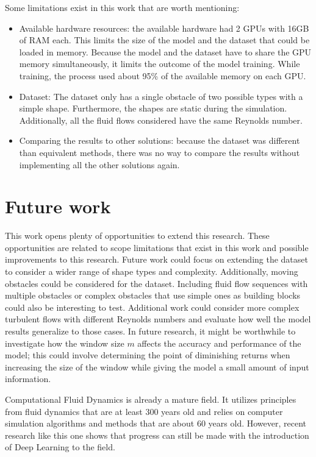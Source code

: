 Some limitations exist in this work that are worth mentioning:
\begin{itemize}
    \item Available hardware resources: the available hardware had 2 GPUs with 16GB of RAM each. This limits the size of the model and the dataset that could be loaded in memory. Because the model and the dataset have to share the GPU memory simultaneously, it limits the outcome of the model training. While training, the process used about 95\% of the available memory on each GPU.
    \item Dataset: The dataset only has a single obstacle of two possible types with a simple shape. Furthermore, the shapes are static during the simulation. Additionally, all the fluid flows considered have the same Reynolds number.
    \item Comparing the results to other solutions: because the dataset was different than equivalent methods, there was no way to compare the results without implementing all the other solutions again.
\end{itemize}

\section{Future work}
\label{sec:FutureWork}
This work opens plenty of opportunities to extend this research. These opportunities are related to scope limitations that exist in this work and possible improvements to this research. Future work could focus on extending the dataset to consider a wider range of shape types and complexity. Additionally, moving obstacles could be considered for the dataset. Including fluid flow sequences with multiple obstacles or complex obstacles that use simple ones as building blocks could also be interesting to test. Additional work could consider more complex turbulent flows with different Reynolds numbers and evaluate how well the model results generalize to those cases. In future research, it might be worthwhile to investigate how the window size $m$ affects the accuracy and performance of the model; this could involve determining the point of diminishing returns when increasing the size of the window while giving the model a small amount of input information.

Computational Fluid Dynamics is already a mature field. It utilizes principles from fluid dynamics that are at least 300 years old and relies on computer simulation algorithms and methods that are about 60 years old. However, recent research like this one shows that progress can still be made with the introduction of Deep Learning to the field.
